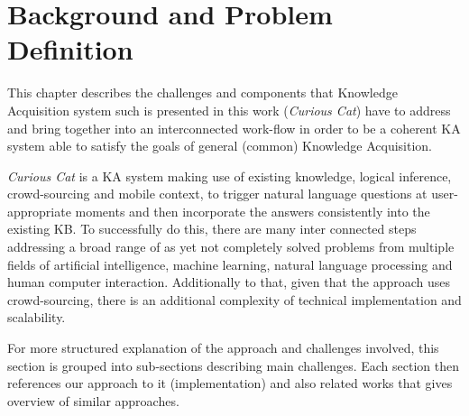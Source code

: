 %
\chapter{Background and Problem Definition}
\label{chapter:background}
This chapter describes the challenges and components that Knowledge Acquisition 
system such is presented in this work (\emph{Curious Cat}) have to address and 
bring together into an interconnected work-flow in order to be a coherent 
KA system able to satisfy the goals of general (common) Knowledge Acquisition. 

\emph{Curious Cat} is a KA system making use of existing knowledge, 
logical inference, crowd-sourcing and mobile context, to trigger natural language
questions at user-appropriate moments and then incorporate the answers consistently
into the existing KB. To successfully do this, there are many inter connected
steps addressing a broad range of as yet not completely solved problems from
multiple fields of artificial intelligence, machine learning, natural language
processing and human computer interaction. Additionally to that, given
that the approach uses crowd-sourcing, there is an additional complexity
of technical implementation and scalability. 

For more structured explanation of the approach and challenges involved, this
section is grouped into sub-sections describing main challenges. Each section
then references our approach to it (implementation) and also related works that
gives overview of similar approaches.

